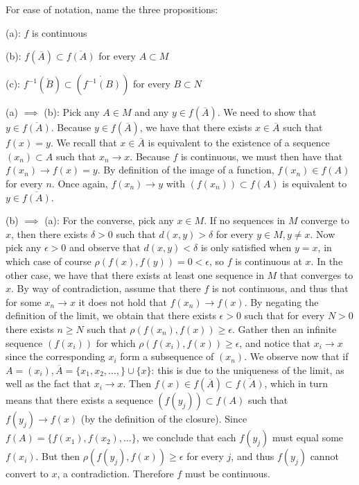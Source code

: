 \begin{solution}
    
    For ease of notation, name the three propositions:

    (a): $f$ is continuous

    (b): $f(\overline{A}) \subset \overline{f(A)}$ for every $A \subset M$

    (c): $f^{-1}(\mathring{B}) \subset (\mathring{f^{-1}(B)})$ for every $B \subset N$

    (a) $\implies$ (b): Pick any $A \in M$ and any $y \in f(\overline{A})$.
    We need to show that $y \in \overline{f(A)}$.
    Because $y \in f(\overline{A})$, we have that there exists $x \in \overline{A}$ such that $f(x) = y$.
    We recall that $x \in \overline{A}$ is equivalent to the existence of a sequence $(x_n) \subset A$ such that $x_n \rightarrow x$.
    Because $f$ is continuous, we must then have that $f(x_n) \rightarrow f(x) = y$.
    By definition of the image of a function, $f(x_n) \in f(A)$ for every $n$.
    Once again, $f(x_n) \rightarrow y$ with $(f(x_n)) \subset f(A)$ is equivalent to $y \in \overline{f(A)}$.

    (b) $\implies$ (a): For the converse, pick any $x \in M$.
    If no sequences in $M$ converge to $x$, then there exists $\delta > 0$ such that $d(x, y) > \delta$ for every $y \in M, y \neq x$.
    Now pick any $\epsilon > 0$ and observe that $d(x, y) < \delta$ is only satisfied when $y = x$, in which case of course $\rho(f(x), f(y)) = 0 < \epsilon$, so $f$ is continuous at $x$.
    In the other case, we have that there exists at least one sequence in $M$ that converges to $x$.
    By way of contradiction, assume that there $f$ is not continuous, and thus that for some $x_n \rightarrow x$ it does not hold that $f(x_n) \rightarrow f(x)$.
    By negating the definition of the limit, we obtain that there exists $\epsilon > 0$ such that for every $N > 0$ there exists $n \geq N$ such that $\rho(f(x_n), f(x)) \geq \epsilon$.
    Gather then an infinite sequence $(f(x_i))$ for which $\rho(f(x_i), f(x)) \geq \epsilon$, and notice that $x_i \rightarrow x$ since the corresponding $x_i$ form a subsequence of $(x_n)$.
    We observe now that if $A = (x_i), \overline{A} = \{x_1, x_2, \ldots, \} \cup \{x\}$: this is due to the uniqueness of the limit, as well as the fact that $x_i \rightarrow x$.
    Then $f(x) \in f(\overline{A}) \subset \overline{f(A)}$, which in turn means that there exists a sequence $(f(y_j)) \subset f(A)$ such that $f(y_j) \rightarrow f(x)$ (by the definition of the closure).
    Since $f(A) = \{f(x_1), f(x_2), \ldots\}$, we conclude that each $f(y_j)$ must equal some $f(x_i)$.
    But then $\rho(f(y_j), f(x)) \geq \epsilon$ for every $j$, and thus $f(y_j)$ cannot convert to $x$, a contradiction.
    Therefore $f$ must be continuous.


\end{solution}
